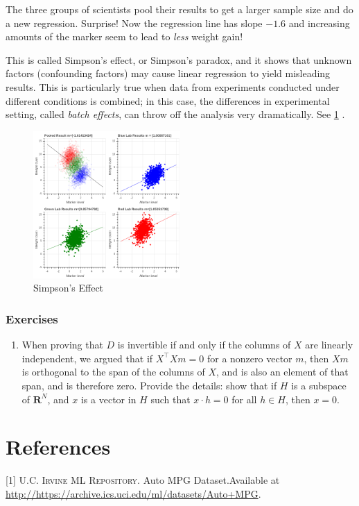 \documentclass[
]{article}
\providecommand{\tightlist}{%
  \setlength{\itemsep}{0pt}\setlength{\parskip}{0pt}}
\newenvironment{cslreferences}%
  {}%
  {\par}
\begin{document}
The three groups of scientists pool their results to get a larger sample
size and do a new regression. Surprise! Now the regression line has
slope \(-1.6\) and increasing amounts of the marker seem to lead to
\emph{less} weight gain!

This is called Simpson's effect, or Simpson's paradox, and it shows that
unknown factors (confounding factors) may cause linear regression to
yield misleading results. This is particularly true when data from
experiments conducted under different conditions is combined; in this
case, the differences in experimental setting, called \emph{batch
effects}, can throw off the analysis very dramatically. See
\cref{fig:simpsons} .

\begin{figure}
\hypertarget{fig:simpsons}{%
\centering
\includegraphics[width=0.5\textwidth,height=\textheight]{../img/SimpsonsEffect.png}
\caption{Simpson's Effect}\label{fig:simpsons}
}
\end{figure}

\hypertarget{exercises-1}{%
\subsubsection{Exercises}\label{exercises-1}}

\begin{enumerate}
\def\labelenumi{\arabic{enumi}.}
\tightlist
\item
  When proving that \(D\) is invertible if and only if the columns of
  \(X\) are linearly independent, we argued that if
  \(X^{\intercal}Xm=0\) for a nonzero vector \(m\), then \(Xm\) is
  orthogonal to the span of the columns of \(X\), and is also an element
  of that span, and is therefore zero. Provide the details: show that if
  \(H\) is a subspace of \(\mathbf{R}^{N}\), and \(x\) is a vector in
  \(H\) such that \(x\cdot h=0\) for all \(h\in H\), then \(x=0\).
\end{enumerate}

\hypertarget{bibliography}{%
\section*{References}\label{bibliography}}

\hypertarget{refs}{}
\begin{cslreferences}
\leavevmode\hypertarget{ref-irvine}{}%
{[}1{]} \textsc{U.C. Irvine ML Repository}. Auto MPG Dataset.Available
at \url{http://https://archive.ics.uci.edu/ml/datasets/Auto+MPG}.
\end{cslreferences}
\end{document}
